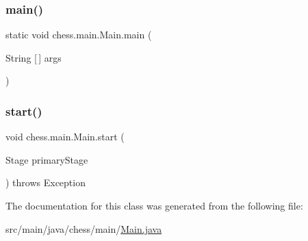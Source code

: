 \subsubsection{\texorpdfstring{main()}{main()}}
{\footnotesize\ttfamily static void chess.\+main.\+Main.\+main (\begin{DoxyParamCaption}\item[{String \mbox{[}$\,$\mbox{]}}]{args }\end{DoxyParamCaption})\hspace{0.3cm}{\ttfamily [static]}}

\mbox{\label{classchess_1_1main_1_1_main_a673791d4659f12729827e8b279ac83f4}} 
\subsubsection{\texorpdfstring{start()}{start()}}
{\footnotesize\ttfamily void chess.\+main.\+Main.\+start (\begin{DoxyParamCaption}\item[{Stage}]{primary\+Stage }\end{DoxyParamCaption}) throws Exception}



The documentation for this class was generated from the following file\+:\begin{DoxyCompactItemize}
\item 
src/main/java/chess/main/\mbox{\hyperlink{_main_8java}{Main.\+java}}\end{DoxyCompactItemize}
